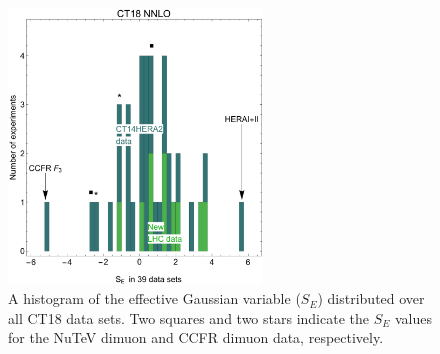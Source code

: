 \begin{figure}[tb]
	\includegraphics[width=0.6\textwidth]{./fig/sqrt2chi2_ct18nnloCount.pdf}
	\caption{A histogram of the effective Gaussian variable ($S_E$) distributed over all CT18 data sets. 
	Two squares and two stars indicate the $S_E$ values for the NuTeV dimuon and CCFR dimuon data, respectively.
\label{fig:sn_ct18}}
\end{figure}

